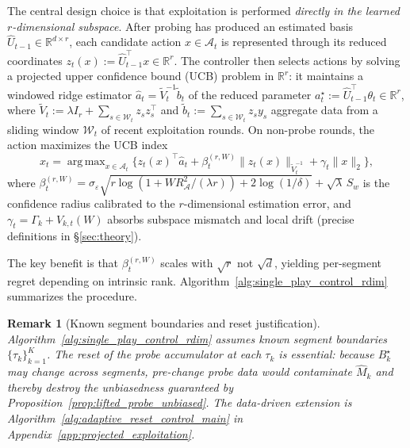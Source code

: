 \documentclass{article}
\newcommand{\R}{\mathbb{R}}
\newcommand{\cA}{\mathcal{A}}
\DeclareMathOperator*{\argmax}{arg\,max}
\newtheorem{remark}{Remark}
\begin{document}
The central design choice is that exploitation is performed \emph{directly in the learned $r$-dimensional subspace}. After probing has produced an estimated basis $\widehat U_{t-1}\in\R^{d\times r}$, each candidate action $x\in\cA_t$ is represented through its reduced coordinates $z_t(x) := \widehat U_{t-1}^\top x \in \R^r.$
The controller then selects actions by solving a projected upper confidence bound (UCB) problem in $\R^r$: it maintains a windowed ridge estimator $\widehat a_t = \widetilde V_t^{-1}\widetilde b_t$ of the reduced parameter $a_t^\star := \widehat U_{t-1}^\top \theta_t \in \R^r$, where $\widetilde V_t := \lambda I_r + \sum_{s \in \mathcal{W}_t} z_s z_s^\top$ and $\widetilde b_t := \sum_{s \in \mathcal{W}_t} z_s y_s$ aggregate data from a sliding window $\mathcal{W}_t$ of recent exploitation rounds. On non-probe rounds, the action maximizes the UCB index
\[
x_t = \argmax_{x \in \cA_t}\bigl\{z_t(x)^\top \widehat a_t + \beta_t^{(r,W)}\|z_t(x)\|_{\widetilde V_t^{-1}} + \gamma_t\|x\|_2\bigr\},
\]
where $\beta_t^{(r,W)} = \sigma_\varepsilon\sqrt{r\log(1 + WR_{\cA}^2/(\lambda r)) + 2\log(1/\delta)} + \sqrt{\lambda}\,S_w$ is the confidence radius calibrated to the $r$-dimensional estimation error, and $\gamma_t = \Gamma_k + V_{k,t}(W)$ absorbs subspace mismatch and local drift (precise definitions in \S\ref{sec:theory}).

The key benefit is that $\beta_t^{(r,W)}$ scales with $\sqrt{r}$ not $\sqrt{d}$, yielding per-segment regret depending on intrinsic rank. Algorithm~\ref{alg:single_play_control_rdim} summarizes the procedure.

\begin{remark}[Known segment boundaries and reset justification]
\label{rem:reset_justification}
Algorithm~\ref{alg:single_play_control_rdim} assumes known segment boundaries $\{\tau_k\}_{k=1}^K$.
The reset of the probe accumulator at each $\tau_k$ is essential: because $B_k^\star$ may change across segments, pre-change probe data would contaminate $\widehat M_k$ and thereby destroy the unbiasedness guaranteed by Proposition~\ref{prop:lifted_probe_unbiased}.
The data-driven extension is Algorithm~\ref{alg:adaptive_reset_control_main} in Appendix~\ref{app:projected_exploitation}.
\end{remark}
\end{document}
